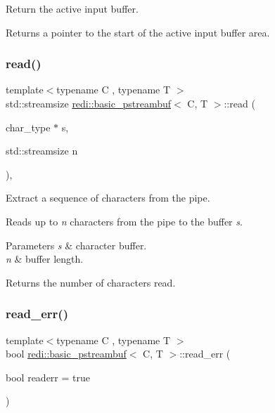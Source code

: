 Return the active input buffer. 

\begin{DoxyReturn}{Returns}
a pointer to the start of the active input buffer area. 
\end{DoxyReturn}
\mbox{\label{classredi_1_1basic__pstreambuf_a3ac98c1a7954de8c0c2833f3da30788b}} 
\subsubsection{\texorpdfstring{read()}{read()}}
{\footnotesize\ttfamily template$<$typename C , typename T $>$ \\
std\+::streamsize \mbox{\hyperlink{classredi_1_1basic__pstreambuf}{redi\+::basic\+\_\+pstreambuf}}$<$ C, T $>$\+::read (\begin{DoxyParamCaption}\item[{char\+\_\+type $\ast$}]{s,  }\item[{std\+::streamsize}]{n }\end{DoxyParamCaption})\hspace{0.3cm}{\ttfamily [inline]}, {\ttfamily [protected]}}



Extract a sequence of characters from the pipe. 

Reads up to {\itshape n} characters from the pipe to the buffer {\itshape s}.


\begin{DoxyParams}{Parameters}
{\em s} & character buffer. \\
\hline
{\em n} & buffer length. \\
\hline
\end{DoxyParams}
\begin{DoxyReturn}{Returns}
the number of characters read. 
\end{DoxyReturn}
\mbox{\label{classredi_1_1basic__pstreambuf_ac831c1a0ec6deb5ef2cbcab5cf510969}} 
\subsubsection{\texorpdfstring{read\+\_\+err()}{read\_err()}}
{\footnotesize\ttfamily template$<$typename C , typename T $>$ \\
bool \mbox{\hyperlink{classredi_1_1basic__pstreambuf}{redi\+::basic\+\_\+pstreambuf}}$<$ C, T $>$\+::read\+\_\+err (\begin{DoxyParamCaption}\item[{bool}]{readerr = {\ttfamily true} }\end{DoxyParamCaption})\hspace{0.3cm}{\ttfamily [inline]}}



